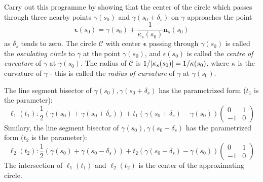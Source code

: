 \documentclass{article}
\DeclarePairedDelimiter\abs{\lvert}{\rvert}
\begin{document}
\begin{enumerate}
Carry out this programme by showing that the center of the circle which passes through three nearby points $\gamma(s_0)$ and $\gamma(s_0\pm \delta_s)$ on $
\gamma$ approaches the point
\begin{equation}\label{eq:center_of_circle}
\bm{\epsilon}(s_0) = \gamma(s_0) + \frac{1}{\kappa_s(s_0)}\bm{n}_s(s_0)
\end{equation}
as $\delta_s$ tends to zero. The circle $\mathcal{C}$ with center $\bm{\epsilon}$ passing through $\gamma(s_0)$ is called the \textit{osculating circle} to $\gamma$ at the point $\gamma(s_0)$, and $\epsilon(s_0)$ is called the \textit{centre of curvature} of $\gamma$ at $\gamma(s_0)$. The radius of $\mathcal{C}$
is $1/\abs{\kappa_s(s_0)}=1/\kappa(s_0)$, where $\kappa$ is the curvature of $\gamma$ - this is called the \textit{radius of curvature} of $\gamma$ at $\gamma(s_0)$.
\begin{solution}
The line segment bisector of $\gamma(s_0),\gamma(s_0+\delta_s)$ has the parametrized form ($t_1$ is the parameter): 
$$
\ell_1(t_1): \frac{1}{2}(\gamma(s_0)+\gamma(s_0+\delta_s)) + t_1 (\gamma(s_0+\delta_s)-\gamma(s_0))\begin{pmatrix}0 & 1 \\ -1 & 0\end{pmatrix}
$$
Similary, the line segment bisector of $\gamma(s_0),\gamma(s_0-\delta_s)$ has the parametrized form ($t_2$ is the parameter): 
$$
\ell_2(t_2): \frac{1}{2}(\gamma(s_0)+\gamma(s_0-\delta_s)) + t_2 (\gamma(s_0-\delta_s)-\gamma(s_0))\begin{pmatrix}0 & 1 \\ -1 & 0\end{pmatrix} 
$$
The intersection of $\ell_1(t_1)$ and $\ell_2(t_2)$ is the center of the approximating circle.


\end{solution}
\end{enumerate}
\end{document}
